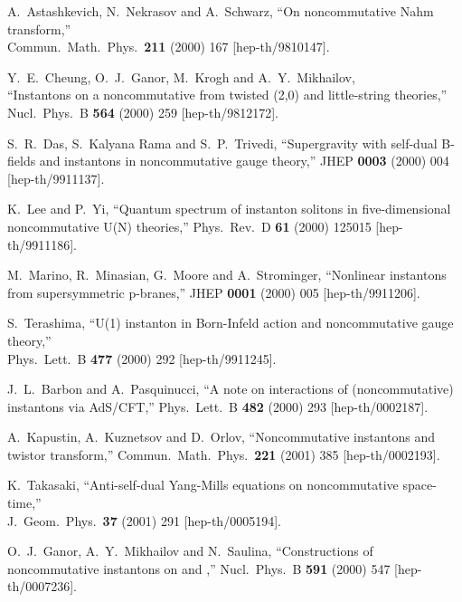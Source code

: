 \documentclass[a4paper,11pt]{article}
\numberwithin{equation}{section}
\begin{document}
{\begin{thebibliography}{99}
A.~Astashkevich, N.~Nekrasov and A.~Schwarz,
``On noncommutative Nahm transform,''\\
Commun.\ Math.\ Phys.\  {\bf 211} (2000) 167
[hep-th/9810147].

Y.~E.~Cheung, O.~J.~Ganor, M.~Krogh and A.~Y.~Mikhailov,\\
``Instantons on a noncommutative \coordHE{} from twisted (2,0) and  
  little-string theories,'' \\
Nucl.\ Phys.\ B {\bf 564} (2000) 259
[hep-th/9812172].

S.~R.~Das, S.~Kalyana Rama and S.~P.~Trivedi,
``Supergravity with self-dual B-fields and instantons in noncommutative  
  gauge theory,''
JHEP {\bf 0003} (2000) 004
[hep-th/9911137].

K.~Lee and P.~Yi,
``Quantum spectrum of instanton solitons in five-dimensional  
  noncommutative U(N) theories,''
Phys.\ Rev.\ D {\bf 61} (2000) 125015
[hep-th/9911186].

M.~Marino, R.~Minasian, G.~Moore and A.~Strominger,
``Nonlinear instantons from supersymmetric p-branes,''
JHEP {\bf 0001} (2000) 005
[hep-th/9911206].

S.~Terashima,
``U(1) instanton in Born-Infeld action and noncommutative gauge theory,''\\
Phys.\ Lett.\ B {\bf 477} (2000) 292
[hep-th/9911245].

J.~L.~Barbon and A.~Pasquinucci,
``A note on interactions of (noncommutative) instantons via AdS/CFT,''
Phys.\ Lett.\ B {\bf 482} (2000) 293
[hep-th/0002187].

A.~Kapustin, A.~Kuznetsov and D.~Orlov,
``Noncommutative instantons and twistor transform,''
Commun.\ Math.\ Phys.\  {\bf 221} (2001) 385
[hep-th/0002193].

K.~Takasaki,
``Anti-self-dual Yang-Mills equations on noncommutative space-time,''\\
J.\ Geom.\ Phys.\  {\bf 37} (2001) 291
[hep-th/0005194].

O.~J.~Ganor, A.~Y.~Mikhailov and N.~Saulina,
``Constructions of noncommutative instantons on \coordHE{} and \coordHE{},''
Nucl.\ Phys.\ B {\bf 591} (2000) 547
[hep-th/0007236].


\end{thebibliography}}
\end{document}
